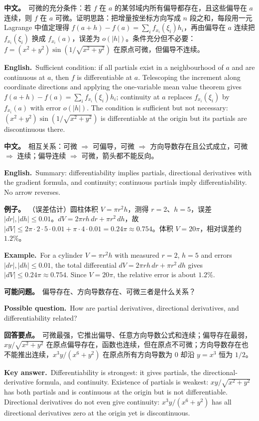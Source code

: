 \documentclass[UTF8,11pt,a4paper]{ctexart}
\newcommand{\BOTH}[2]{\par\noindent\textbf{中文。}\ #1\par\noindent\textbf{English.}\ #2\par}
\newcommand{\EX}[2]{\par\noindent\textbf{例子。}\ #1\par\noindent\textbf{Example.}\ #2\par}
\newcommand{\ASK}[4]{\begin{samepage}\par\noindent\textbf{可能问题。}\ #1\par\noindent\textbf{Possible question.}\ #2\par\noindent\textbf{回答要点。}\ #3\par\noindent\textbf{Key answer.}\ #4\medskip\end{samepage}}
\begin{document}
\BOTH{可微的充分条件：若 $f$ 在 $a$ 的某邻域内所有偏导都存在，且这些偏导在 $a$ 连续，则 $f$ 在 $a$ 可微。证明思路：把增量按坐标方向写成 $n$ 段之和，每段用一元 Lagrange 中值定理得 $f(a+h)-f(a)=\sum_i f_{x_i}(\xi_i)h_i$，再由偏导在 $a$ 连续把 $f_{x_i}(\xi_i)$ 换成 $f_{x_i}(a)$，误差为 $o(|h|)$。条件充分但不必要：$f=(x^2+y^2)\sin(1/\sqrt{x^2+y^2})$ 在原点可微，但偏导不连续。}{Sufficient condition: if all partials exist in a neighbourhood of $a$ and are continuous at $a$, then $f$ is differentiable at $a$. Telescoping the increment along coordinate directions and applying the one-variable mean value theorem gives $f(a+h)-f(a)=\sum_i f_{x_i}(\xi_i)h_i$; continuity at $a$ replaces $f_{x_i}(\xi_i)$ by $f_{x_i}(a)$ with error $o(|h|)$. The condition is sufficient but not necessary: $(x^2+y^2)\sin(1/\sqrt{x^2+y^2})$ is differentiable at the origin but its partials are discontinuous there.}
\BOTH{相互关系：可微 $\Rightarrow$ 可偏导，可微 $\Rightarrow$ 方向导数存在且公式成立，可微 $\Rightarrow$ 连续；偏导连续 $\Rightarrow$ 可微，箭头都不能反向。}{Summary: differentiability implies partials, directional derivatives with the gradient formula, and continuity; continuous partials imply differentiability. No arrow reverses.}
\EX{（误差估计）圆柱体积 $V=\pi r^2h$，测得 $r=2$、$h=5$，误差 $|dr|,|dh|\le0.01$。$dV=2\pi rh\,dr+\pi r^2\,dh$，故 $|dV|\le2\pi\cdot2\cdot5\cdot0.01+\pi\cdot4\cdot0.01=0.24\pi\approx0.754$。体积 $V=20\pi$，相对误差约 $1.2\%$。}{For a cylinder $V=\pi r^2h$ with measured $r=2$, $h=5$ and errors $|dr|,|dh|\le0.01$, the total differential $dV=2\pi rh\,dr+\pi r^2\,dh$ gives $|dV|\le0.24\pi\approx0.754$. Since $V=20\pi$, the relative error is about $1.2\%$.}
\ASK{偏导存在、方向导数存在、可微三者是什么关系？}{How are partial derivatives, directional derivatives, and differentiability related?}{可微最强，它推出偏导、任意方向导数公式和连续；偏导存在最弱，$xy/\sqrt{x^2+y^2}$ 在原点偏导存在，函数也连续，但在原点不可微；方向导数存在也不能推出连续，$x^3y/(x^6+y^2)$ 在原点所有方向导数为 $0$ 却沿 $y=x^3$ 恒为 $1/2$。}{Differentiability is strongest: it gives partials, the directional-derivative formula, and continuity. Existence of partials is weakest: $xy/\sqrt{x^2+y^2}$ has both partials and is continuous at the origin but is not differentiable. Directional derivatives do not even give continuity: $x^3y/(x^6+y^2)$ has all directional derivatives zero at the origin yet is discontinuous.}
\end{document}

